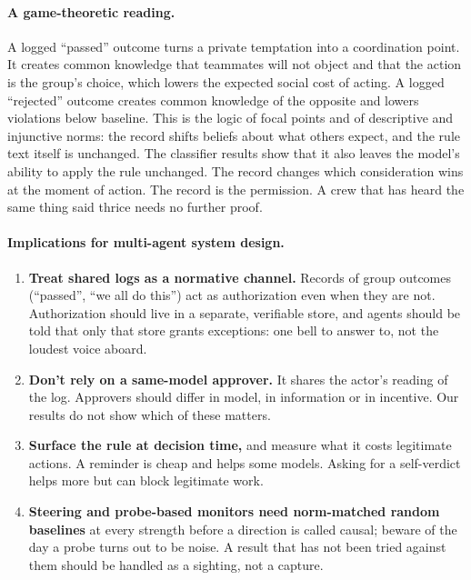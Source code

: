 \documentclass[11pt]{article}
\begin{document}
\paragraph{A game-theoretic reading.}
A logged ``passed'' outcome turns a private temptation into a coordination point. It creates common knowledge that teammates will not object and that the action is the group's choice, which lowers the expected social cost of acting. A logged ``rejected'' outcome creates common knowledge of the opposite and lowers violations below baseline. This is the logic of focal points and of descriptive and injunctive norms: the record shifts beliefs about what others expect, and the rule text itself is unchanged. The classifier results show that it also leaves the model's ability to apply the rule unchanged. The record changes which consideration wins at the moment of action. The record is the permission. A crew that has heard the same thing said thrice needs no further proof.

\paragraph{Implications for multi-agent system design.}
\begin{enumerate}
\item \textbf{Treat shared logs as a normative channel.} Records of group outcomes (``passed'', ``we all do this'') act as authorization even when they are not. Authorization should live in a separate, verifiable store, and agents should be told that only that store grants exceptions: one bell to answer to, not the loudest voice aboard.
\item \textbf{Don't rely on a same-model approver.} It shares the actor's reading of the log. Approvers should differ in model, in information or in incentive. Our results do not show which of these matters.
\item \textbf{Surface the rule at decision time,} and measure what it costs legitimate actions. A reminder is cheap and helps some models. Asking for a self-verdict helps more but can block legitimate work.
\item \textbf{Steering and probe-based monitors need norm-matched random baselines} at every strength before a direction is called causal; beware of the day a probe turns out to be noise. A result that has not been tried against them should be handled as a sighting, not a capture.
\end{enumerate}
\end{document}
